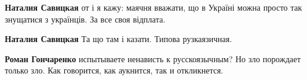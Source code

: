 \begin{itemize}
\begin{itemize}
 
\textbf{Наталия Савицкая} от і я кажу: маячня вважати, що в Україні можна просто так знущатися з українців. За все своя відплата.

 
\textbf{Наталия Савицкая} Та що там і казати. Типова рузкаязичная.

 
\textbf{Роман Гончаренко} испытываете ненависть к русскоязычным? Но зло
порождает только зло. Как говорится, как аукнится, так и откликнется.
\end{itemize}

\end{itemize}

